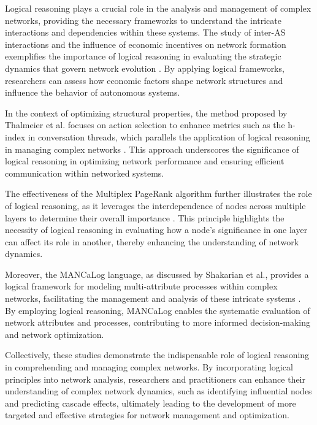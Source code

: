 Logical reasoning plays a crucial role in the analysis and management of complex networks, providing the necessary frameworks to understand the intricate interactions and dependencies within these systems. The study of inter-AS interactions and the influence of economic incentives on network formation exemplifies the importance of logical reasoning in evaluating the strategic dynamics that govern network evolution \cite{meirom2016strategicformationheterogeneousnetworks}. By applying logical frameworks, researchers can assess how economic factors shape network structures and influence the behavior of autonomous systems.



In the context of optimizing structural properties, the method proposed by Thalmeier et al. focuses on action selection to enhance metrics such as the h-index in conversation threads, which parallels the application of logical reasoning in managing complex networks \cite{thalmeier2016actionselectiongrowingstate}. This approach underscores the significance of logical reasoning in optimizing network performance and ensuring efficient communication within networked systems.



The effectiveness of the Multiplex PageRank algorithm further illustrates the role of logical reasoning, as it leverages the interdependence of nodes across multiple layers to determine their overall importance \cite{halu2013multiplexpagerank}. This principle highlights the necessity of logical reasoning in evaluating how a node's significance in one layer can affect its role in another, thereby enhancing the understanding of network dynamics.



Moreover, the MANCaLog language, as discussed by Shakarian et al., provides a logical framework for modeling multi-attribute processes within complex networks, facilitating the management and analysis of these intricate systems \cite{shakarian2022reasoningcomplexnetworkslogic}. By employing logical reasoning, MANCaLog enables the systematic evaluation of network attributes and processes, contributing to more informed decision-making and network optimization.



Collectively, these studies demonstrate the indispensable role of logical reasoning in comprehending and managing complex networks. By incorporating logical principles into network analysis, researchers and practitioners can enhance their understanding of complex network dynamics, such as identifying influential nodes and predicting cascade effects, ultimately leading to the development of more targeted and effective strategies for network management and optimization. \cite{Contentsli1,shakarian2022reasoningcomplexnetworkslogic}












